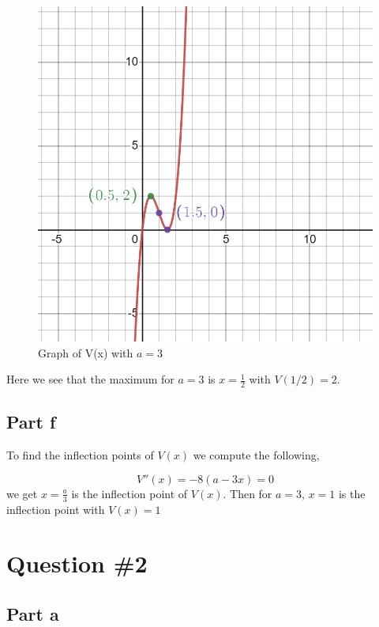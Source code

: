 \documentclass{article}
\begin{document}
\begin{figure}[H]
    \centering
    \includegraphics[scale=0.3]{graph_a.png}
    \caption{Graph of V(x) with $a = 3$}
    \label{fig:my_label}
\end{figure}

Here we see that the maximum for $a = 3$ is $x = \frac{1}{2}$ with $V(1/2) = 2$.
\subsection*{Part f}
To find the inflection points of $V(x)$ we compute the following,

\begin{equation*}
   V''(x) = -8(a-3x) = 0
\end{equation*}
we get $x = \frac{a}{3}$ is the inflection point of $V(x)$. Then for $a = 3$, $x = 1$ is the inflection point with $V(x) = 1$

\section*{Question \#2}

\subsection*{Part a}
\end{document}
